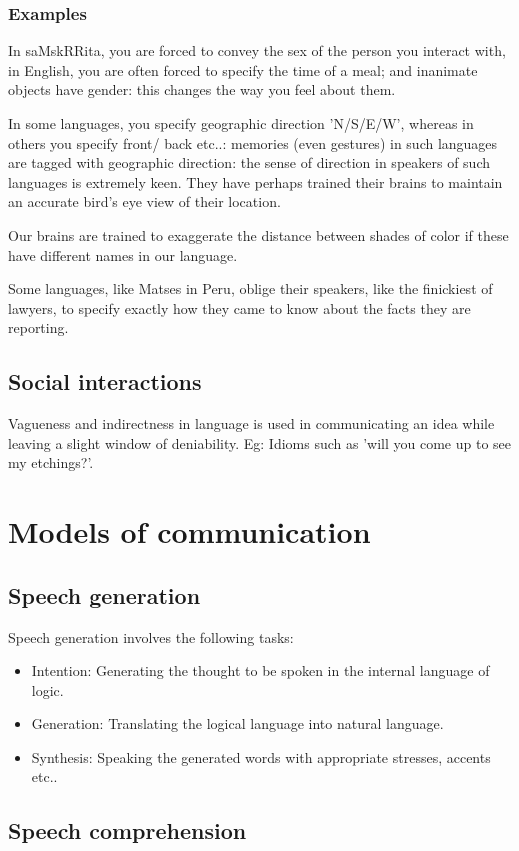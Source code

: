 \documentclass[oneside, article]{memoir}
\begin{document}
\subsection{Examples}
In saMskRRita, you are forced to convey the sex of the person you interact with, in English, you are often forced to specify the time of a meal; and inanimate objects have gender: this changes the way you feel about them.

In some languages, you specify geographic direction 'N/S/E/W', whereas in others you specify front/ back etc..: memories (even gestures) in such languages are tagged with geographic direction: the sense of direction in speakers of such languages is extremely keen. They have perhaps trained their brains to maintain an accurate bird's eye view of their location.

Our brains are trained to exaggerate the distance between shades of color if these have different names in our language.

Some languages, like Matses in Peru, oblige their speakers, like the finickiest of lawyers, to specify exactly how they came to know about the facts they are reporting. 

\section{Social interactions}
Vagueness and indirectness in language is used in communicating an idea while leaving a slight window of deniability. Eg: Idioms such as 'will you come up to see my etchings?'.

\chapter{Models of communication}
\section{Speech generation}
Speech generation involves the following tasks:
\begin{itemize}
 \item Intention: Generating the thought to be spoken in the internal language of logic.
 \item Generation: Translating the logical language into natural language.
 \item Synthesis: Speaking the generated words with appropriate stresses, accents etc..
\end{itemize}

\section{Speech comprehension}
\end{document}

